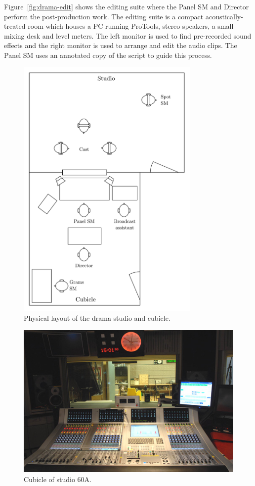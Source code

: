 Figure~\ref{fig:drama-edit} shows the editing suite where the Panel SM and Director perform the post-production work.
The editing suite is a compact acoustically-treated room which houses a PC running ProTools, stereo speakers, a small
mixing desk and level meters.  The left monitor is used to find pre-recorded sound effects and the right monitor is
used to arrange and edit the audio clips. The Panel SM uses an annotated copy of the script to guide this process.

\begin{figure}
  \centering
  \includegraphics[width=3.5in]{figs/drama-layout.pdf}
  \caption{Physical layout of the drama studio and cubicle.}
  \label{fig:drama-layout}
\end{figure}

\begin{figure}
  \centering
  \includegraphics[width=\columnwidth]{figs/60a.jpg}
  \caption{Cubicle of studio 60A.}
  \label{fig:drama-studio}
\end{figure}

